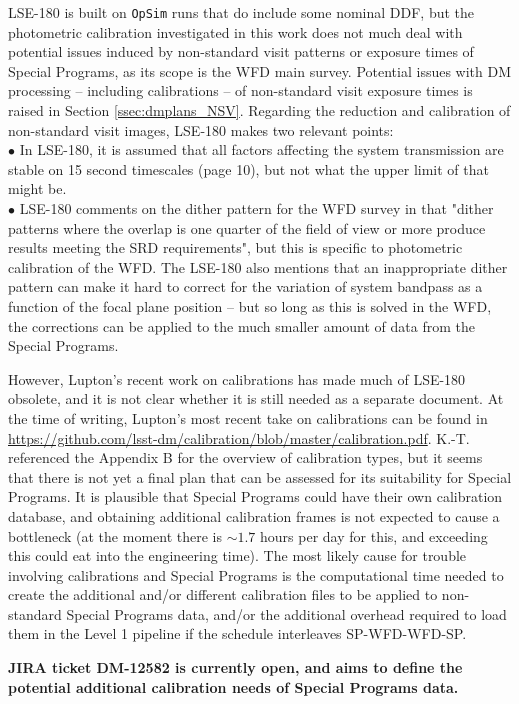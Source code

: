 LSE-180 is built on \texttt{OpSim} runs that do include some nominal DDF, but the photometric calibration investigated in this work does not much deal with potential issues induced by non-standard visit patterns or exposure times of Special Programs, as its scope is the WFD main survey. Potential issues with DM processing -- including calibrations -- of non-standard visit exposure times is raised in Section \ref{ssec:dmplans_NSV}. Regarding the reduction and calibration of non-standard visit images, LSE-180 makes two relevant points: \\
$\bullet$ In LSE-180, it is assumed that all factors affecting the system transmission are stable on 15 second timescales (page 10), but not what the upper limit of that might be. \\
$\bullet$ LSE-180 comments on the dither pattern for the WFD survey in that "dither patterns where the overlap is one quarter of the field of view or more produce results meeting the SRD requirements", but this is specific to photometric calibration of the WFD. The LSE-180 also mentions that an inappropriate dither pattern can make it hard to correct for the variation of system bandpass as a function of the focal plane position -- but so long as this is solved in the WFD, the corrections can be applied to the much smaller amount of data from the Special Programs.

However, Lupton's recent work on calibrations has made much of LSE-180 obsolete, and it is not clear whether it is still needed as a separate document. At the time of writing, Lupton's most recent take on calibrations can be found in \url{https://github.com/lsst-dm/calibration/blob/master/calibration.pdf}. K.-T. referenced the Appendix B for the overview of calibration types, but it seems that there is not yet a final plan that can be assessed for its suitability for Special Programs. It is plausible that Special Programs could have their own calibration database, and obtaining additional calibration frames is not expected to cause a bottleneck (at the moment there is $\sim1.7$ hours per day for this, and exceeding this could eat into the engineering time). The most likely cause for trouble involving calibrations and Special Programs is the computational time needed to create the additional and/or different calibration files to be applied to non-standard Special Programs data, and/or the additional overhead required to load them in the Level 1 pipeline if the schedule interleaves SP-WFD-WFD-SP.

{\bf JIRA ticket DM-12582 is currently open, and aims to define the potential additional calibration needs of Special Programs data.}


